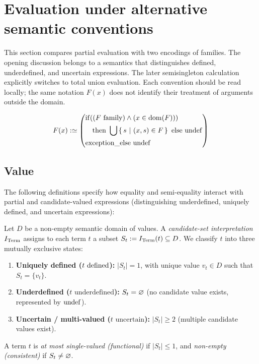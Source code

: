 \def\topic{Evaluation}

\section{Evaluation under alternative semantic conventions}
This section compares partial evaluation with two encodings of families.
The opening discussion belongs to a semantics that distinguishes defined,
underdefined, and uncertain expressions. The later semisingleton calculation
explicitly switches to total union evaluation. Each convention should be
read locally; the same notation $F(x)$ does not identify their treatment of
arguments outside the domain.

\begin{definition}[value]
\[
F(x) :\simeq \left(\begin{aligned}
&\mathrm{if} ((F\mathrm{\ family})\land(x \in \mathrm{dom}(F)))\\
&\quad\mathrm{then}\ \bigcup\left\{\,s\ \middle|\ (x,s)\in F\,\right\}\ \mathrm{else}\ \mathrm{undef}\\
&\mathrm{exception}\_\mathrm{else}\ \mathrm{undef}
\end{aligned}\right)
\]
\end{definition}
\subsection{Value} %
The following definitions specify how equality and semi-equality interact with partial and candidate-valued expressions (distinguishing underdefined, uniquely defined, and uncertain expressions):
\begin{definition}
\label{def:candidate_set_valuation}
Let $D$ be a non-empty semantic domain of values. A \emph{candidate-set interpretation} $I_{\mathrm{Term}}$ assigns to each term $t$ a subset $S_t := I_{\mathrm{Term}}(t) \subseteq D$. We classify $t$ into three mutually exclusive states:
\begin{enumerate}
\item \textbf{Uniquely defined ($t \mathrm{\ defined}$):} $|S_t| = 1$, with unique value $v_t \in D$ such that $S_t = \{v_t\}$.
\item \textbf{Underdefined ($t \text{ underdefined}$):} $S_t = \varnothing$ (no candidate value exists, represented by $\mathrm{undef}$).
\item \textbf{Uncertain / multi-valued ($t \text{ uncertain}$):} $|S_t| \ge 2$ (multiple candidate values exist).
\end{enumerate}
A term $t$ is \emph{at most single-valued (functional)} if $|S_t| \le 1$, and \emph{non-empty (consistent)} if $S_t \ne \varnothing$.
\end{definition}

